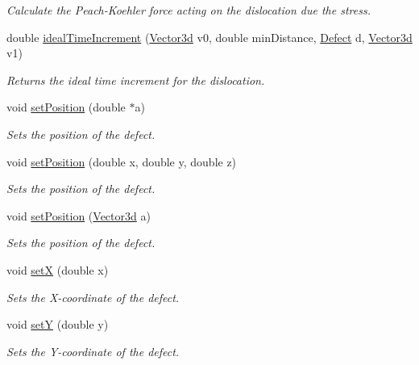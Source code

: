 \begin{DoxyCompactItemize}
\begin{DoxyCompactList}\small\item\em Calculate the Peach-\/\-Koehler force acting on the dislocation due the stress. \end{DoxyCompactList}\item 
double \hyperlink{classDislocation_ab79ff28442fea06055020a2bba087f78}{ideal\-Time\-Increment} (\hyperlink{classVector3d}{Vector3d} v0, double min\-Distance, \hyperlink{classDefect}{Defect} d, \hyperlink{classVector3d}{Vector3d} v1)
\begin{DoxyCompactList}\small\item\em Returns the ideal time increment for the dislocation. \end{DoxyCompactList}\item 
void \hyperlink{classDefect_a2d233d13a8a93f6fba463a1fbc1c6c9f}{set\-Position} (double $\ast$a)
\begin{DoxyCompactList}\small\item\em Sets the position of the defect. \end{DoxyCompactList}\item 
void \hyperlink{classDefect_ad1a6acd8399d2ecabb7ce2b77623bbec}{set\-Position} (double x, double y, double z)
\begin{DoxyCompactList}\small\item\em Sets the position of the defect. \end{DoxyCompactList}\item 
void \hyperlink{classDefect_a36ffa9b4b01d38ed8a95ca2c78973cc4}{set\-Position} (\hyperlink{classVector3d}{Vector3d} a)
\begin{DoxyCompactList}\small\item\em Sets the position of the defect. \end{DoxyCompactList}\item 
void \hyperlink{classDefect_a5a65f73da6a572d9e7109b31239e441d}{set\-X} (double x)
\begin{DoxyCompactList}\small\item\em Sets the X-\/coordinate of the defect. \end{DoxyCompactList}\item 
void \hyperlink{classDefect_a268606391a4eaee3de029d2005648b6f}{set\-Y} (double y)
\begin{DoxyCompactList}\small\item\em Sets the Y-\/coordinate of the defect. \end{DoxyCompactList}\item 

\end{DoxyCompactItemize}
